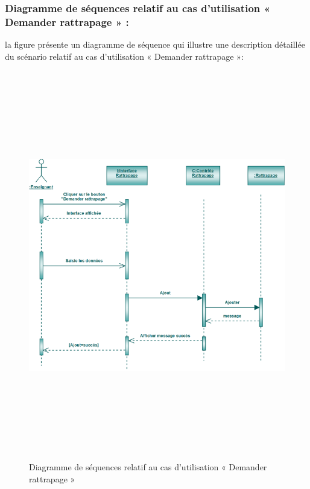 \documentclass[12 pt]{report}
\begin{document}
\subsubsection{Diagramme de séquences relatif au cas d’utilisation « Demander rattrapage » :}
la figure   présente un diagramme de séquence qui illustre une description détaillée du scénario relatif au cas d’utilisation « Demander rattrapage »: 
{\begin{figure}[h]
 \begin{center}
\includegraphics[width= 18 cm ,height=  17cm]{sdr.PNG}
\caption{Diagramme de séquences relatif au cas d’utilisation « Demander rattrapage  »}

\end{center}
\end{figure}}
\newpage
\end{document}
